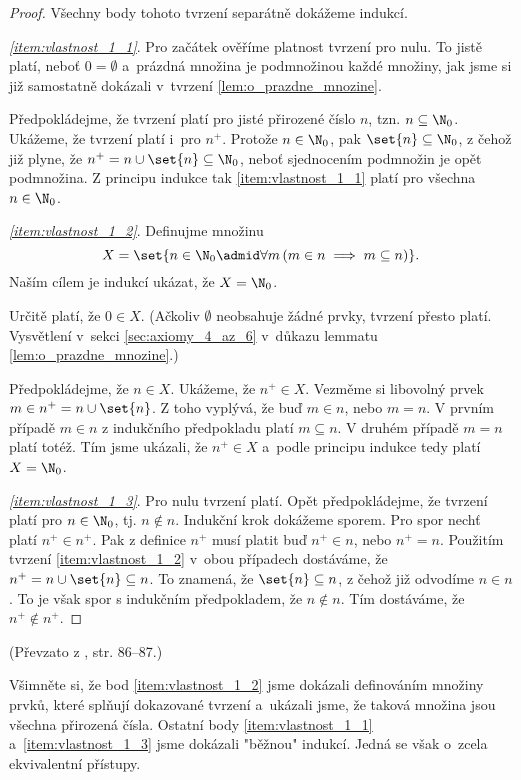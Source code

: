 \begin{proof}
    Všechny body tohoto tvrzení separátně dokážeme indukcí.\par
    \textit{\ref{item:vlastnost_1_1}}. Pro začátek ověříme platnost tvrzení pro nulu. To jistě platí, neboť $0=\emptyset$ a~prázdná množina je podmnožinou každé množiny, jak jsme si již samostatně dokázali v~tvrzení \ref{lem:o_prazdne_mnozine}.\par
    Předpokládejme, že tvrzení platí pro jisté přirozené číslo $n$, tzn. $n\subseteq\N_0$. Ukážeme, že tvrzení platí i~pro $n^+$. Protože $n\in\N_0$, pak $\set{n}\subseteq\N_0$, z čehož již plyne, že $n^+=n\cup\set{n}\subseteq\N_0$, neboť sjednocením podmnožin je opět podmnožina. Z principu indukce tak \ref{item:vlastnost_1_1} platí pro všechna $n\in\N_0$.\par
    \textit{\ref{item:vlastnost_1_2}}. Definujme množinu
    \begin{equation*}
        X=\set{n\in\N_0\admid \forall m\,(m\in n\implies m\subseteq n)}.
    \end{equation*} 
    Naším cílem je indukcí ukázat, že $X=\N_0$.\par
    Určitě platí, že $0\in X$. (Ačkoliv $\emptyset$ neobsahuje žádné prvky, tvrzení přesto platí. Vysvětlení v~sekci \ref{sec:axiomy_4_az_6} v~důkazu lemmatu \ref{lem:o_prazdne_mnozine}.)\par
    Předpokládejme, že $n\in X$. Ukážeme, že $n^+\in X$. Vezměme si libovolný prvek $m\in n^+=n\cup\set{n}$. Z toho vyplývá, že buď $m\in n$, nebo $m=n$. V prvním případě $m\in n$ z indukčního předpokladu platí $m\subseteq n$. V druhém případě $m=n$ platí totéž. Tím jsme ukázali, že $n^+\in X$ a~podle principu indukce tedy platí $X=\N_0$.\par
    \textit{\ref{item:vlastnost_1_3}}. Pro nulu tvrzení platí. Opět předpokládejme, že tvrzení platí pro $n\in\N_0$, tj. $n\notin n$. Indukční krok dokážeme sporem. Pro spor nechť platí $n^+\in n^+$. Pak z definice $n^+$ musí platit buď $n^+\in n$, nebo $n^+=n$. Použitím tvrzení \ref{item:vlastnost_1_2} v~obou případech dostáváme, že $n^+=n\cup\set{n}\subseteq n$. To znamená, že $\set{n}\subseteq n$, z čehož již odvodíme $n\in n$. To je však spor s indukčním předpokladem, že $n\notin n$. Tím dostáváme, že $n^+\notin n^+$.
\end{proof}
(Převzato z \cite{BalcarStepanek1986}, str. 86--87.)\par
Všimněte si, že bod \ref{item:vlastnost_1_2} jsme dokázali definováním množiny prvků, které splňují dokazované tvrzení a~ukázali jsme, že taková množina jsou všechna přirozená čísla. Ostatní body \ref{item:vlastnost_1_1} a~\ref{item:vlastnost_1_3} jsme dokázali "běžnou" indukcí. Jedná se však o~zcela ekvivalentní přístupy.
\medskip

